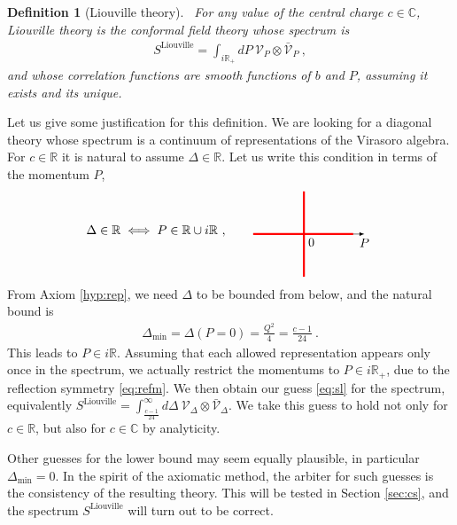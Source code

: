 \documentclass[12pt, a4paper]{article}
\theoremstyle{break}
\newtheorem{defn}[exo]{Definition}
\begin{document}
\begin{defn}[Liouville theory]
 ~\label{def:liou}
 For any value of the central charge $c\in\mathbb{C}$, Liouville theory is the conformal field theory whose spectrum is 
 \begin{align}
  S^\mathrm{Liouville} 
= \int_{i\mathbb{R}_+}  dP\ \mathcal V_P \otimes 
   \bar{\mathcal V}_P\ , 
   \label{eq:sl}
 \end{align}
and whose correlation functions are smooth functions of $b$ and $P$, assuming it exists and its unique.
\end{defn}
Let us give some justification for this definition. We are looking for a diagonal theory whose spectrum is a continuum of representations of the Virasoro algebra. For $c\in \mathbb{R}$ it is natural to assume $\Delta\in \mathbb{R}$. Let us write this condition in terms of the momentum $P$,
\begin{align}
 \Delta \in \mathbb{R} \iff P\in \mathbb{R} \cup i\mathbb{R}\ ,
  \qquad
   \begin{tikzpicture}[scale = .4, baseline=(current  bounding  box.center)]
   \draw[-latex] (-1.6, 0)  -- (2, 0) node[below right] {$0$} -- (4, 0)  -- (6.3, 0) node[below] {$P$};
  \draw[red, ultra thick] (-1.6, 0) -- (5.5, 0);
  \draw[red, ultra thick] (2, -3) -- (2, 3);
 \end{tikzpicture}
\end{align}
From Axiom \ref{hyp:rep}, 
we need $\Delta$ to be bounded from below, and the natural bound is 
\begin{align}
 \Delta_\text{min}=\Delta\left(P=0\right) = \frac{Q^2}{4}=\frac{c-1}{24}\ .
\end{align}
This leads to $P \in i\mathbb{R}$. Assuming that each allowed representation appears only once in the spectrum, we actually restrict the momentums to $P \in i\mathbb{R}_+$, due to the reflection symmetry \eqref{eq:refm}.
We then obtain our guess \eqref{eq:sl} for the spectrum, equivalently $S^\mathrm{Liouville} 
= \int_{\frac{c-1}{24}}^\infty d\Delta\ \mathcal V_{\Delta}\otimes \bar{\mathcal{V}}_\Delta $.
We take this guess to hold not only for $c\in\mathbb{R}$, but also for $c\in\mathbb{C}$ by analyticity.

Other guesses for the lower bound may seem equally plausible, in particular $\Delta_\text{min}=0$. In the spirit of the axiomatic method, the arbiter for such guesses is the consistency of the resulting theory. 
This will be tested in Section \ref{sec:cs}, and the spectrum $S^\mathrm{Liouville}$ will turn out to be correct.
\end{document}
